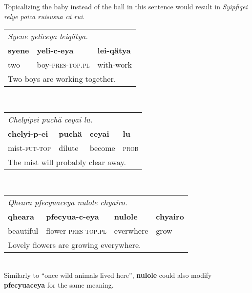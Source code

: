 \documentclass{article}
\begin{document}
Topicalizing the baby instead of the ball in this sentence would result in \emph{Syipfiqei relye poica ruisusua c\"a rui}.
\\[0.5cm]
\begin{tabular}{l l l}
\multicolumn{3}{l}{\emph{Syene yeliceya leiq\"atya.}} \\
\textbf{syene} & \textbf{yeli-c-eya} & \textbf{lei-q\"atya} \\
two & boy-\textsc{pres-top.pl} & with-work \\
\multicolumn{3}{l}{Two boys are working together.} \\
\end{tabular}
\\[0.5cm]
\begin{tabular}{l l l l}
\multicolumn{4}{l}{\emph{Chelyipei puch\"a ceyai lu.}} \\
\textbf{chelyi-p-ei} & \textbf{puch\"a} & \textbf{ceyai} & \textbf{lu} \\
mist-\textsc{fut-top} & dilute & become & \textsc{prob} \\
\multicolumn{4}{l}{The mist will probably clear away.} \\
\end{tabular}
\\[0.5cm]
\begin{tabular}{l l l l}
\multicolumn{4}{l}{\emph{Qheara pfecyuaceya nulole chyairo.}} \\
\textbf{qheara} & \textbf{pfecyua-c-eya} & \textbf{nulole} & \textbf{chyairo} \\
beautiful & flower-\textsc{pres-top.pl} & everwhere & grow \\
\multicolumn{4}{l}{Lovely flowers are growing everywhere.} \\
\end{tabular}
\\
Similarly to ``once wild animals lived here'', \textbf{nulole} could also modify \textbf{pfecyuaceya} for the same meaning.
\end{document}

